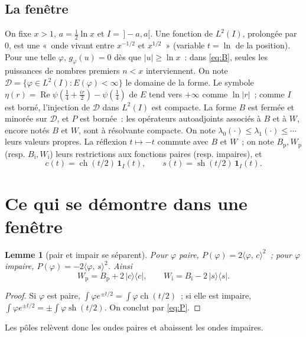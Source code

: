 \documentclass[11pt,a4paper]{article}
\newtheorem{lemme}[theoreme]{Lemme}
\theoremstyle{definition}
\theoremstyle{remark}
\newcommand{\ps}[2]{\langle #1,\,#2\rangle}
\DeclareMathOperator{\re}{Re}
\DeclareMathOperator{\sh}{sh}
\DeclareMathOperator{\ch}{ch}
\begin{document}
\subsection*{La fenêtre}
On fixe $x>1$, $a=\tfrac12\ln x$ et $I=\,]-a,a[$. Une fonction de $L^2(I)$, prolongée par $0$, est une «~onde vivant entre
$x^{-1/2}$ et $x^{1/2}$~» (variable $t=\ln$ de la position). Pour une telle $\varphi$, $g_\varphi(u)=0$ dès que $|u|\ge\ln x$~:
dans \eqref{eq:B}, seules les puissances de nombres premiers $n<x$ interviennent. On note
$\mathcal D=\{\varphi\in L^2(I): E(\varphi)<\infty\}$ le domaine de la forme. Le symbole
$\eta(r)=\re\psi(\frac14+\frac{ir}2)-\psi(\frac14)$ de $E$ tend vers $+\infty$ comme $\ln|r|$~; comme $I$ est borné,
l'injection de $\mathcal D$ dans $L^2(I)$ est compacte. La forme $B$ est fermée et minorée sur $\mathcal D$, et $P$ est
bornée~: les opérateurs autoadjoints associés à $B$ et à $W$, encore notés $B$ et $W$, sont à résolvante compacte. On note
$\lambda_0(\cdot)\le\lambda_1(\cdot)\le\cdots$ leurs valeurs propres. La réflexion $t\mapsto-t$ commute avec $B$ et $W$~;
on note $B_{\mathrm p},W_{\mathrm p}$ (resp. $B_{\mathrm i},W_{\mathrm i}$) leurs restrictions aux fonctions paires (resp.
impaires), et
\[
c(t)=\ch(t/2)\,\mathbf 1_I(t),\qquad s(t)=\sh(t/2)\,\mathbf 1_I(t).
\]

\section{Ce qui se démontre dans une fenêtre}

\begin{lemme}[pair et impair se séparent]\label{lem:parite}
Pour $\varphi$ paire, $P(\varphi)=2\ps{\varphi}{c}^2$~; pour $\varphi$ impaire, $P(\varphi)=-2\ps{\varphi}{s}^2$. Ainsi
\[
W_{\mathrm p}=B_{\mathrm p}+2\,|c\rangle\langle c|,\qquad W_{\mathrm i}=B_{\mathrm i}-2\,|s\rangle\langle s| .
\]
\end{lemme}
\begin{proof}
Si $\varphi$ est paire, $\int\varphi e^{\pm t/2}=\int\varphi\ch(t/2)$~; si elle est impaire, $\int\varphi e^{\pm t/2}=\pm\int\varphi\sh(t/2)$.
On conclut par \eqref{eq:P}.
\end{proof}

Les pôles relèvent donc les ondes paires et abaissent les ondes impaires.
\end{document}
